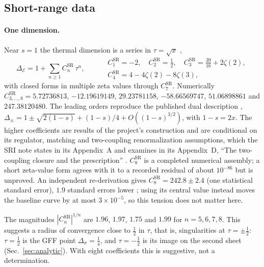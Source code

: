 \documentclass[11pt,a4paper]{article}
\numberwithin{equation}{section}
\newcommand{\De}{\Delta_{\mathcal E}}   %
\newcommand{\Ds}{\Delta_\sigma}
\newcommand{\CSR}{C^{\mathrm{SR}}}
\newcommand{\sci}[2]{#1\times10^{#2}}
\begin{document}
\subsection{Short-range data}\label{sec:srdata}
\paragraph{One dimension.} Near $s=1$ the thermal dimension is a series in
$\tau=\sqrt{x}$ \cite{noteSRI},
\begin{equation}
 \De=1+\sum_{n\ge1}\CSR_n\,\tau^n,\qquad
 \begin{aligned}
 &\CSR_1=-2,\quad \CSR_2=\tfrac12,\quad \CSR_3=\tfrac{39}{16}+2\zeta(2),\\
 &\CSR_4=4-4\zeta(2)-8\zeta(3),
 \end{aligned}
 \label{eq:SRseries}
\end{equation}
with closed forms in multiple zeta values through $\CSR_7$. Numerically
$\CSR_{3,\dots,8}=5.72736813$, $-12.19619149$, $29.23781158$, $-58.66569747$,
$51.06898861$ and $247.38120480$. The leading orders reproduce the published
dual description \cite{Benedetti:2024wgx,Benedetti:2025nzp},
$\Delta_\pm=1\pm\sqrt{2(1-s)}+(1-s)/4+O((1-s)^{3/2})$, with $1-s=2x$. The higher
coefficients are results of the project's construction and are conditional on its
regulator, matching and two-coupling renormalization assumptions, which the SRI note states
in its Appendix~A and examines in its Appendix~D, ``The two-coupling closure and the
prescription'' \cite{noteSRI}.
$\CSR_8$ is a completed numerical assembly; a short zeta-value form agrees with it to a
recorded residual of about $10^{-86}$ but is unproved. An independent re-derivation gives
$\CSR_8=242.8\pm2.4$ (one statistical standard error), $1.9$ standard errors lower
\cite{noteSRI}; using its central value instead moves the baseline curve by at most
$\sci{3}{-5}$, so this tension does not matter here.

The magnitudes $|\CSR_n|^{1/n}$ are $1.96$, $1.97$, $1.75$ and $1.99$ for $n=5,6,7,8$.
This suggests a radius of convergence close to $\frac12$ in $\tau$, that is, singularities
at $\tau=\pm\frac12$: $\tau=\frac12$ is the GFF point $\Ds=\frac14$, and $\tau=-\frac12$ is its
image on the second sheet (Sec.~\ref{sec:analytic}). With eight coefficients this is
suggestive, not a determination.
\end{document}
